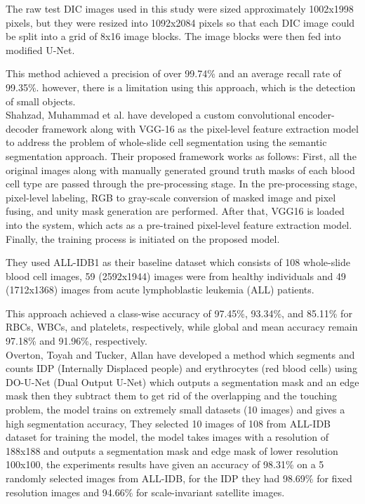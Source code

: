 \documentclass[conference]{IEEEtran}
\begin{document}
The raw test DIC images used in this study were sized approximately 1002x1998 pixels, but they were resized into 1092x2084 pixels so that each DIC image could be split into a grid of 8x16 image blocks. The image blocks were then fed into modified U-Net.

This method achieved a precision of over 99.74\% and an average recall rate of 99.35\%. however, there is a limitation using this approach, which is the detection of small objects.\\

Shahzad, Muhammad et al. \cite{shahzad2020robust} have developed a custom convolutional encoder-decoder framework along with VGG-16 as the pixel-level feature extraction model to address the problem of whole-slide cell segmentation using the semantic segmentation approach. Their proposed framework works as follows: First, all the original images along with manually generated ground truth masks of each blood cell type are passed through the pre-processing stage. In the pre-processing stage, pixel-level labeling, RGB to gray-scale conversion of masked image and pixel fusing, and unity mask generation are performed. After that, VGG16 is loaded into the system, which acts as a pre-trained pixel-level feature extraction model. Finally, the training process is initiated on the proposed model.

They used ALL-IDB1 as their baseline dataset which consists of 108 whole-slide blood cell images, 59 (2592x1944) images were from healthy individuals and 49 (1712x1368) images from acute lymphoblastic leukemia (ALL) patients.

This approach achieved a class-wise accuracy of 97.45\%, 93.34\%, and 85.11\% for RBCs, WBCs, and platelets, respectively, while global and mean accuracy remain 97.18\% and 91.96\%, respectively.\\

Overton, Toyah and Tucker, Allan \cite{10.1007/978-3-030-44584-3_31} have developed a method which segments and counts IDP (Internally Displaced people) and erythrocytes (red blood cells) using DO-U-Net (Dual Output U-Net) which outputs a segmentation mask and an edge mask then they subtract them to get rid of the overlapping and the touching problem, the model trains on extremely small datasets (10 images) and gives a high segmentation accuracy, They selected 10 images of 108 from ALL-IDB dataset for training the model, the model takes images with a resolution of 188x188 and outputs a segmentation mask and edge mask of lower resolution 100x100, the experiments results have given an accuracy of 98.31\% on a 5 randomly selected images from ALL-IDB, for the IDP they had 98.69\% for fixed resolution images and 94.66\% for scale-invariant satellite images.\\
\end{document}
